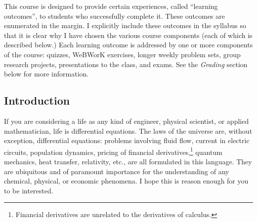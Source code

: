 \documentclass[symmetric]{tufte-handout}
\begin{document}
    This course is designed to provide certain experiences, called “learning
    outcomes”, to students who successfully complete it. These outcomes are
    enumerated in the margin.%
    I explicitly include these outcomes in the syllabus so that it is clear
    why I have chosen the various course components (each of which is
    described below.) Each learning outcome is addressed by one or more
    components of the course: quizzes, WeBWorK exercises, longer weekly problem sets, group research projects,
    presentations to the class, and exams.
    See the \emph{Grading} section below for more information.

\subsection{Introduction}

If you are considering a life as any kind of engineer, physical scientist, or
applied mathematician, life is differential equations. The laws of the
universe are, without exception, differential equations: problems involving
fluid flow, current in electric circuits, population dynamics, pricing of
financial derivatives,\footnote{Financial derivatives are unrelated to the
derivatives of calculus.} quantum mechanics, heat transfer, relativity, etc.,
are all formulated in this language. They are ubiquitous and of paramount
importance for the understanding of any chemical, physical, or economic 
phenomena. I hope this is reason enough for you to be interested.
\end{document}
